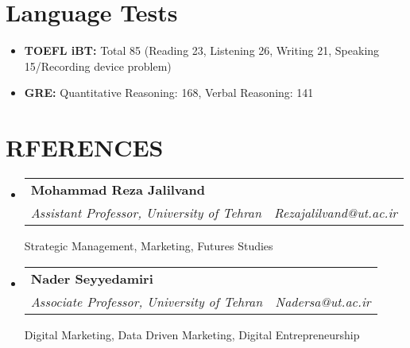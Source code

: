 \documentclass[letterpaper,11pt]{article}
\makeatletter
\newcommand{\resumeSubheading}[4]{
  \vspace{5pt}\item
    \begin{tabular*}{0.97\textwidth}{l@{\extracolsep{\fill}}r}
      \textbf{#1} & #2 \\
      \textit{\small#3} & \textit{\small #4} \\
    \end{tabular*}\vspace{-5pt}
}
\newcommand{\resumeSubHeadingListStart}{\begin{itemize}[leftmargin=*]}
\newcommand{\resumeSubHeadingListEnd}{\end{itemize}}
\makeatother
\begin{document}
\section{Language Tests}
    \resumeSubHeadingListStart
        \item{
            \textbf{TOEFL iBT: }{Total 85 (Reading 23, Listening 26, Writing 21, Speaking 15/Recording device problem)}
        }\vspace{-5pt}
        \item{
            \textbf{GRE: }{Quantitative Reasoning: 168, Verbal Reasoning: 141} 
        }
    \resumeSubHeadingListEnd

\section{RFERENCES}
    \resumeSubHeadingListStart

        \resumeSubheading
            {Mohammad Reza Jalilvand}{}
            {Assistant Professor, University of Tehran \vspace{7pt}}{Rezajalilvand@ut.ac.ir}
                {Strategic Management, Marketing, Futures Studies}

        \resumeSubheading
            {Nader Seyyedamiri}{}
            {Associate Professor, University of Tehran \vspace{7pt}}{Nadersa@ut.ac.ir}
                    {Digital Marketing, Data Driven Marketing, Digital Entrepreneurship}
                        
  \resumeSubHeadingListEnd

\end{document}
